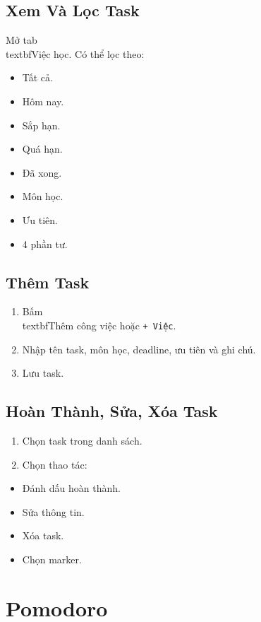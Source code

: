 \documentclass[12pt,a4paper]{report}
\begin{document}
\subsection{Xem Và Lọc Task}

Mở tab \\textbf{Việc học}. Có thể lọc theo:

\begin{itemize}
\item Tất cả.
\item Hôm nay.
\item Sắp hạn.
\item Quá hạn.
\item Đã xong.
\item Môn học.
\item Ưu tiên.
\item 4 phần tư.
\end{itemize}

\subsection{Thêm Task}

\begin{enumerate}
\item Bấm \\textbf{Thêm công việc} hoặc \texttt{+ Việc}.
\item Nhập tên task, môn học, deadline, ưu tiên và ghi chú.
\item Lưu task.
\end{enumerate}

\subsection{Hoàn Thành, Sửa, Xóa Task}

\begin{enumerate}
\item Chọn task trong danh sách.
\item Chọn thao tác:
\end{enumerate}
\begin{itemize}
\item Đánh dấu hoàn thành.
\item Sửa thông tin.
\item Xóa task.
\item Chọn marker.
\end{itemize}

\section{Pomodoro}
\end{document}
